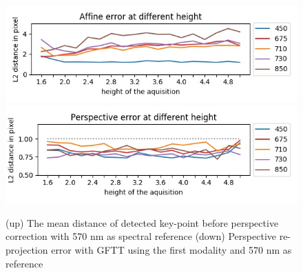 \documentclass[a4paper,twoside]{article}
\begin{document}
	\begin{figure}[h]
		\centering
		\includegraphics[width=\linewidth]{../figures/affine-allignement-rmse.jpg} \\
		\includegraphics[width=\linewidth]{../figures/prespective-allignement-rmse.jpg}
		\caption{
			(up) The mean distance of detected key-point before perspective correction with 570 nm as spectral reference
			(down) Perspective re-projection error with GFTT using the first modality and 570 nm as reference
		}
		\label{fig:perspective-error}
	\end{figure}
	
\end{document}
